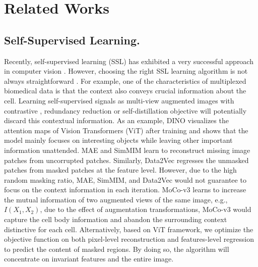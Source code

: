 \documentclass[10pt,twocolumn,letterpaper]{article}
\begin{document}
\section{Related Works}\label{sec:relatedwork}
\subsection{Self-Supervised Learning.} Recently, self-supervised learning (SSL) has exhibited a very successful approach in computer vision \cite{simclr,byol,moco,dino,mae,beit}. However, choosing the right SSL learning algorithm is not always straightforward \cite{ericsson2021well}. For example, one of the characteristics of multiplexed biomedical data is that the context also conveys crucial information about the cell. Learning self-supervised signals as multi-view augmented images with contrastive \cite{simclr,byol,moco,morency,completer}, redundancy reduction \cite{twins} or self-distillation \cite{dino} objective will potentially discard this contextual information. As an example, DINO \cite{dino} visualizes the attention maps of Vision Transformers (ViT) \cite{vit} after training and shows that the model mainly focuses on interesting objects while leaving other important information unattended. MAE \cite{mae} and SimMIM \cite{simmim} learn to reconstruct missing image patches from uncorrupted patches. Similarly, Data2Vec \cite{data2vec} regresses the unmasked patches from masked patches at the feature level. However, due to the high random masking ratio, MAE, SimMIM, and Data2Vec would not guarantee to focus on the context information in each iteration. MoCo-v3 \cite{mocov3} learns to increase the mutual information of two augmented views of the same image, e.g., $I(X_1,X_2)$, due to the effect of augmentation transformations, MoCo-v3 would capture the cell body information and abandon the surrounding context distinctive for each cell. Alternatively, based on ViT \cite{vit} framework, we optimize the objective function on both pixel-level reconstruction \cite{mae,simmim,beit} and features-level regression \cite{data2vec} to predict the content of masked regions. By doing so, the algorithm will concentrate on invariant features and the entire image.
\end{document}
